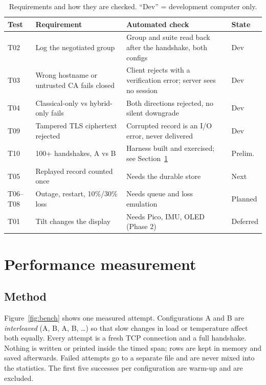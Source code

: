 \documentclass[11pt,a4paper]{article}
\begin{document}
\begin{table}[h]
\centering
\caption{Requirements and how they are checked. ``Dev'' = development computer only.}
\label{tab:tests}
\small
\begin{tabularx}{\linewidth}{@{}llXl@{}}
\toprule
Test & Requirement & Automated check & State \\
\midrule
T02 & Log the negotiated group & Group and suite read back after the handshake, both configs & Dev \\
T03 & Wrong hostname or untrusted CA fails closed & Client rejects with a verification error; server sees no session & Dev \\
T04 & Classical-only vs hybrid-only fails & Both directions rejected, no silent downgrade & Dev \\
T09 & Tampered TLS ciphertext rejected & Corrupted record is an I/O error, never delivered & Dev \\
T10 & 100+ handshakes, A vs B & Harness built and exercised; see Section~\ref{sec:results} & Prelim. \\
T05 & Replayed record counted once & Needs the durable store & Next \\
T06--T08 & Outage, restart, 10\%/30\% loss & Needs queue and loss emulation & Planned \\
T01 & Tilt changes the display & Needs Pico, IMU, OLED (Phase 2) & Deferred \\
\bottomrule
\end{tabularx}
\end{table}

\section{Performance measurement}
\label{sec:results}

\subsection{Method}

Figure~\ref{fig:bench} shows one measured attempt. Configurations A and B are \emph{interleaved}
(A, B, A, B, \dots) so that slow changes in load or temperature affect both equally. Every attempt
is a fresh TCP connection and a full handshake. Nothing is written or printed inside the timed
span; rows are kept in memory and saved afterwards. Failed attempts go to a separate file and are
never mixed into the statistics. The first five successes per configuration are warm-up and are
excluded.
\end{document}
